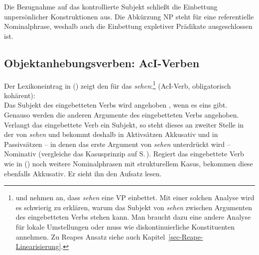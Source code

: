 {Die Bezugnahme auf das kontrollierte Subjekt schließt die Einbettung unpersönlicher Konstruktionen aus.
Die Abkürzung NP steht für eine referentielle Nominalphrase, weshalb auch die Einbettung
expletiver Prädikate ausgeschlossen ist.





\subsection{Objektanhebungsverben: AcI-Verben}
%



Der Lexikoneintrag in () zeigt den \localw für das \aciv \emph{sehen}:\footnote{
        \citet[]{HM94a} und \citet[]{Suchsland97a} nehmen an,
        dass \emph{sehen} eine VP einbettet. Mit einer solchen Analyse wird
        es schwierig zu erklären, warum das Subjekt von \emph{sehen} zwischen
        Argumenten des eingebetteten Verbs stehen kann. Man braucht
        dazu eine andere Analyse für lokale Umstellungen
        oder muss wie \citet{Reape94a} diskontinuierliche Konstituenten
        annehmen. Zu Reapes Ansatz siehe auch Kapitel~\ref{sec-Reape-Linearisierung}.%
}
\eas
\label{le-sehen}
 (AcI-Verb, obligatorisch kohärent):\\
\zs{}
Das Subjekt des eingebetteten Verbs wird angehoben , wenn es eins gibt.
Genauso werden die anderen Argumente des eingebetteten Verbs  angehoben.
Verlangt das eingebettete Verb ein Subjekt, so steht dieses an zweiter Stelle in
der \compsl von \emph{sehen} und bekommt deshalb in Aktivsätzen
Akkusativ und in Passivsätzen -- in denen das erste Argument von \emph{sehen} unterdrückt wird -- 
Nominativ (vergleiche das Kasusprinzip auf S.\,\pageref{case-p}). 
Regiert das eingebettete Verb wie in () noch weitere Nominalphrasen mit strukturellem Kasus, bekommen
diese ebenfalls Akkusativ.
\ea
Er sieht ihn den Aufsatz lesen.
\z

}
